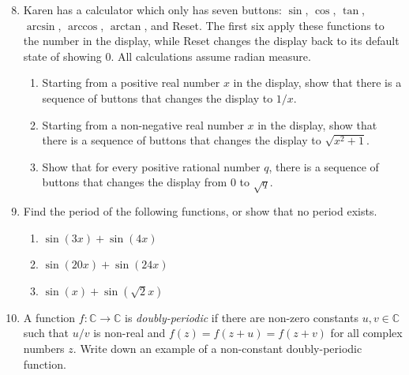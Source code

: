 \begin{enumerate}\setcounter{enumi}{7}
\item Karen has a calculator which only has seven buttons: $\sin$, $\cos$, $\tan$, $\arcsin$, $\arccos$, $\arctan$, and Reset. The first six apply these functions to the number in the display, while Reset changes the display back to its default state of showing 0. All calculations assume radian measure.
\begin{enumerate}
\item Starting from a positive real number $x$ in the display, show that there is a sequence of buttons that changes the display to $1/x$.
\item Starting from a non-negative real number $x$ in the display, show that there is a sequence of buttons that changes the display to $\sqrt{x^2 + 1}$.
\item Show that for every positive rational number $q$, there is a sequence of buttons that changes the display from $0$ to $\sqrt{q}$.
\end{enumerate}
\item Find the period of the following functions, or show that no period exists.
\begin{enumerate}
\item $\sin(3x) + \sin(4x)$
\item $\sin(20x) + \sin(24x)$
\item $\sin(x) + \sin(\sqrt{2}x)$
\end{enumerate}
\item A function $f:\mathbb{C}\to\mathbb{C}$ is \emph{doubly-periodic} if there are non-zero constants $u,v\in\mathbb{C}$ such that $u/v$ is non-real and $f(z) = f(z + u) = f(z + v)$ for all complex numbers $z$. Write down an example of a non-constant doubly-periodic function.
\end{enumerate}